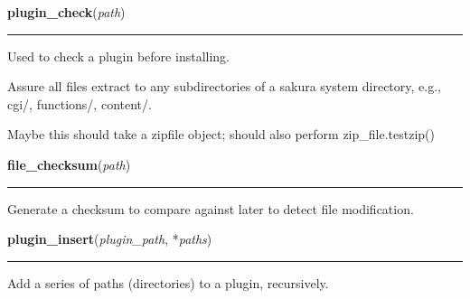     \label{sakura:plugin_check}

    \vspace{0.5ex}

\hspace{.8\funcindent}\begin{boxedminipage}{\funcwidth}

    \raggedright \textbf{plugin\_check}(\textit{path})

    \vspace{-1.5ex}

    \rule{\textwidth}{0.5\fboxrule}
\setlength{\parskip}{2ex}
    Used to check a plugin before installing.

    Assure all files extract to any subdirectories of a sakura system 
    directory, e.g., cgi/, functions/, content/.

    Maybe this should take a zipfile object; should also perform 
    zip\_file.testzip()

\setlength{\parskip}{1ex}
    \end{boxedminipage}

    \label{sakura:file_checksum}

    \vspace{0.5ex}

\hspace{.8\funcindent}\begin{boxedminipage}{\funcwidth}

    \raggedright \textbf{file\_checksum}(\textit{path})

    \vspace{-1.5ex}

    \rule{\textwidth}{0.5\fboxrule}
\setlength{\parskip}{2ex}
    Generate a checksum to compare against later to detect file 
    modification.

\setlength{\parskip}{1ex}
    \end{boxedminipage}

    \label{sakura:plugin_insert}

    \vspace{0.5ex}

\hspace{.8\funcindent}\begin{boxedminipage}{\funcwidth}

    \raggedright \textbf{plugin\_insert}(\textit{plugin\_path}, *\textit{paths})

    \vspace{-1.5ex}

    \rule{\textwidth}{0.5\fboxrule}
\setlength{\parskip}{2ex}
    Add a series of paths (directories) to a plugin, recursively.

\setlength{\parskip}{1ex}
    \end{boxedminipage}

